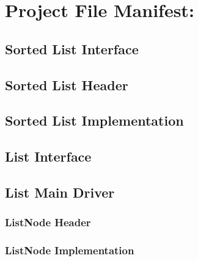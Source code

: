 \documentclass[10pt,letterpaper]{article}
\begin{document}
\section*{Project File Manifest:}

\subsection*{Sorted List Interface}



\subsection*{Sorted List Header}



\subsection*{Sorted List Implementation}



\subsection*{List Interface}



\noindent\hrulefill

\subsection*{List Main Driver}



\noindent\hrulefill

\subsubsection*{ListNode Header}



\noindent\hrulefill

\subsubsection*{ListNode Implementation}


\end{document}
